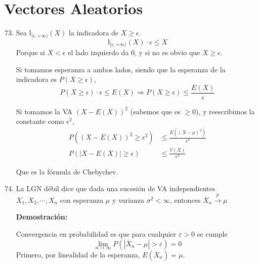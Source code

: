 \section{Vectores Aleatorios}
\begin{enumerate}
	\setcounter{enumi}{72}
	\item
		Sea $\mathbb{I}_{[\epsilon, +\infty)}(X)$ la indicadora de $X\geq \epsilon$.
		$$\mathbb{I}_{[\epsilon, +\infty)}(X)\cdot \epsilon \leq X$$
		Porque si $X<\epsilon$ el lado izquierdo da $0$, y si no es obvio que $X\geq \epsilon$.
		
		Si tomamos esperanza a ambos lados, siendo que la esperanza de la indicadora es $P(X \geq \epsilon)$,
		$$P(X\geq\epsilon) \cdot \epsilon \leq E(X) \Rightarrow P(X\geq\epsilon) \leq \frac{E(X)}{\epsilon}$$
		
		Si tomamos la VA $(X - E(X))^2$ (sabemos que es $\geq 0$), y reescribimos la constante como $\epsilon^2$,
		\begin{align*}
			P((X - E(X))^2 \geq\epsilon^2)	& \leq \frac{E((X - \mu)^2)}{\epsilon^2}	\\
			P(|X - E(X)| \geq\epsilon)		& \leq \frac{V(X)}{\epsilon^2}
		\end{align*}
		
		Que es la fórmula de Chebychev.
		
	\item
		La LGN débil dice que dada una sucesión de VA independientes $X_1, X_2, \cdots, X_n$
		con esperanza $\mu$ y varianza $\sigma^2 < \infty$, entonces
		$\overline X_n \xrightarrow{p} \mu$
		
		\textbf{Demostración:}
		
		Convergencia en probabilidad es que para cualquier $\varepsilon > 0$ se cumple
		$$\lim_{n\rightarrow\infty}P(|\overline X_n - \mu| > \varepsilon) = 0$$
		Primero, por linealidad de la esperanza, $E(\overline X_n) = \mu$.
		

\end{enumerate}
